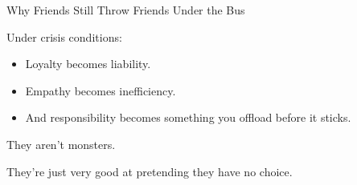 \begin{PsychologicalSidebar}{Why Friends Still Throw Friends Under the Bus}
    \medskip

    Under crisis conditions:

    \begin{itemize}
        \item Loyalty becomes liability.
        \item Empathy becomes inefficiency.
        \item And responsibility becomes something you offload before it sticks.
    \end{itemize}

    \medskip

    They aren’t monsters.

    \medskip

    They’re just very good at pretending they have no choice.

\end{PsychologicalSidebar}

